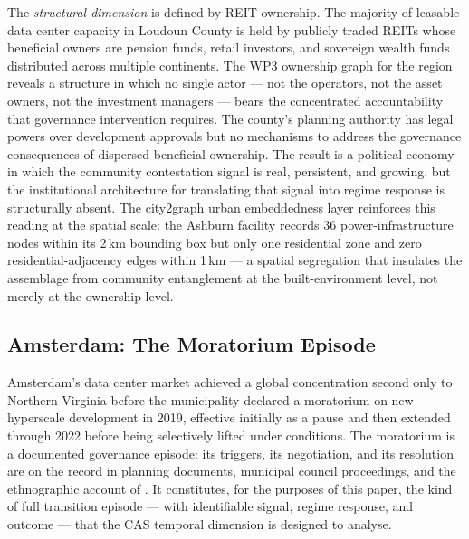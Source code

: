 The \textit{structural dimension} is defined by REIT ownership. The majority of leasable data center capacity in Loudoun County is held by publicly traded REITs whose beneficial owners are pension funds, retail investors, and sovereign wealth funds distributed across multiple continents. The WP3 ownership graph for the region reveals a structure in which no single actor — not the operators, not the asset owners, not the investment managers — bears the concentrated accountability that governance intervention requires. The county's planning authority has legal powers over development approvals but no mechanisms to address the governance consequences of dispersed beneficial ownership. The result is a political economy in which the community contestation signal is real, persistent, and growing, but the institutional architecture for translating that signal into regime response is structurally absent. The city2graph urban embeddedness layer reinforces this reading at the spatial scale: the Ashburn facility records 36 power-infrastructure nodes within its 2\,km bounding box but only one residential zone and zero residential-adjacency edges within 1\,km --- a spatial segregation that insulates the assemblage from community entanglement at the built-environment level, not merely at the ownership level.

\subsection{Amsterdam: The Moratorium Episode}

Amsterdam's data center market achieved a global concentration second only to Northern Virginia before the municipality declared a moratorium on new hyperscale development in 2019, effective initially as a pause and then extended through 2022 before being selectively lifted under conditions. The moratorium is a documented governance episode: its triggers, its negotiation, and its resolution are on the record in planning documents, municipal council proceedings, and the ethnographic account of \citet{vonderau2019storing}. It constitutes, for the purposes of this paper, the kind of full transition episode — with identifiable signal, regime response, and outcome — that the CAS temporal dimension is designed to analyse.

